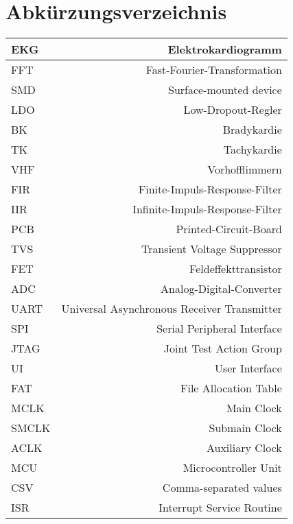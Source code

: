 
\section{Abkürzungsverzeichnis} 

\begin{tabular}[]{l|r}
EKG & Elektrokardiogramm 
\\
\hline
FFT & Fast-Fourier-Transformation 
\\
\hline
SMD & Surface-mounted device 
\\
\hline
LDO & Low-Dropout-Regler 
\\
\hline
BK & Bradykardie 
\\
\hline
TK & Tachykardie
\\
\hline
VHF & Vorhofflimmern
\\
\hline
FIR & Finite-Impuls-Response-Filter
\\
\hline
IIR & Infinite-Impuls-Response-Filter
\\
\hline
PCB & Printed-Circuit-Board
\\
\hline
TVS & Transient Voltage Suppressor
\\
\hline
FET & Feldeffekttransistor
\\
\hline
ADC & Analog-Digital-Converter
\\
\hline
UART & Universal Asynchronous Receiver Transmitter
\\
\hline
SPI & Serial Peripheral Interface
\\
\hline
JTAG & Joint Test Action Group
\\
\hline
UI & User Interface
\\
\hline
FAT & File Allocation Table
\\
\hline
MCLK & Main Clock
\\
\hline
SMCLK & Submain Clock
\\
\hline
ACLK & Auxiliary Clock
\\
\hline
MCU & Microcontroller Unit
\\
\hline
CSV & Comma-separated values
\\
\hline
ISR & Interrupt Service Routine

\end{tabular}
